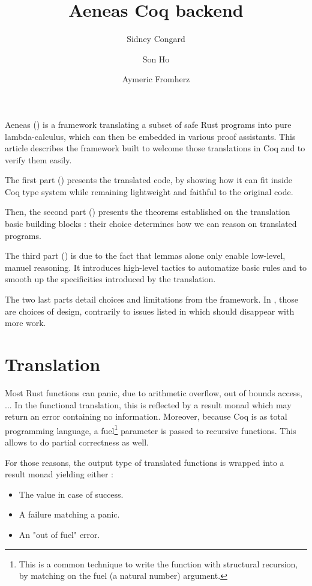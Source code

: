 \documentclass{article}
\author{
     Sidney Congard
\and Son Ho
\and Aymeric Fromherz
}
\title{Aeneas Coq backend}
\begin{document}
\maketitle

Aeneas (\cite{Aeneas}) is a framework translating a subset of safe Rust programs into pure lambda-calculus, which can then be embedded in various proof assistants. This article describes the framework built to welcome those translations in Coq and to  verify them easily.

\medskip

The first part () presents the translated code, by showing how it can fit inside Coq type system while remaining lightweight and faithful to the original code.

Then, the second part () presents the theorems established on the translation basic building blocks : their choice determines how we can reason on translated programs.

The third part () is due to the fact that lemmas alone only enable low-level, manuel reasoning. It introduces high-level tactics to automatize basic rules and to smooth up the specificities introduced by the translation.

The two last parts detail choices and limitations from the framework. In , those are choices of design, contrarily to issues listed in  which should disappear with more work.

\section{Translation}
\label{sec:Translation}

Most Rust functions can panic, due to arithmetic overflow, out of bounds access, ... In the functional translation, this is reflected by a result monad which may return an error containing no information. Moreover, because Coq is as total programming language, a fuel\footnote{This is a common technique to write the function with structural recursion, by matching on the fuel (a natural number) argument.} parameter is passed to recursive functions. This allows to do partial correctness as well.

For those reasons, the output type of translated functions is wrapped into a result monad yielding either :
\begin{itemize}
    \item The value in case of success.
    \item A failure matching a panic.
    \item An "out of fuel" error.
\end{itemize}
\end{document}
